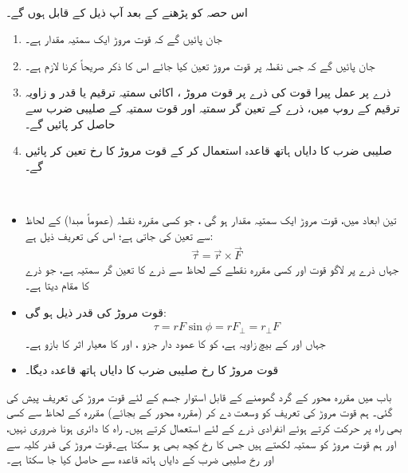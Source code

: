\\
اس حصہ کو پڑھنے کے بعد آپ ذیل کے قابل ہوں گے۔
\begin{enumerate}[1.]
\item
جان پائیں گے کہ قوت مروڑ ایک  سمتیہ  مقدار ہے۔
\item
جان پائیں گے کہ جس نقطہ پر قوت مروڑ  تعین کیا جائے اس  کا   ذکر صریحاً  کرنا   لازم ہے۔
\item
ذرے پر عمل پیرا قوت کی ذرے پر قوت مروڑ ، اکائی سمتیہ ترقیم یا قدر و زاویہ ترقیم  کے روپ میں،  ذرے کے تعین گر سمتیہ  اور قوت سمتیہ  کے صلیبی ضرب سے حاصل  کر پائیں گے۔
\item
صلیبی ضرب   کا دایاں ہاتھ قاعدہ استعمال کر کے قوت مروڑ کا رخ تعین کر پائیں گے۔
\end{enumerate}

\\
\begin{itemize}
\item
تین ابعاد میں، قوت مروڑ ایک  سمتیہ مقدار  ہو گی  ، جو کسی مقررہ نقطہ (عموماً مبدا)  کے لحاظ سے تعین کی جاتی ہے؛ اس کی تعریف ذیل ہے:
\begin{align*}
\vec{\tau}=\vec{r}\times \vec{F}
\end{align*}
جہاں  ذرے پر لاگو قوت اور    کسی مقررہ نقطے کے لحاظ سے ذرے کا تعین گر سمتیہ ہے، جو ذرے کا مقام دیتا ہے۔
\item
قوت مروڑ  کی قدر   ذیل ہو گی:
\begin{align*}
\tau=rF\sin\phi=rF_{\perp}=r_{\perp}F
\end{align*}
جہاں  اور  کے بیچ زاویہ  ہے،  کو  کا عمود دار جزو ، اور   کا معیار اثر کا بازو  ہے۔
\item
قوت مروڑ  کا رخ صلیبی ضرب کا دایاں ہاتھ قاعدہ  دیگا۔
\end{itemize}

باب  میں مقررہ محور کے گرد گھومنے کے قابل  استوار جسم   کے لئے قوت مروڑ  کی تعریف پیش کی گئی۔ ہم قوت مروڑ کی تعریف کو وسعت دے کر  (مقررہ محور کے بجائے)  مقررہ   کے لحاظ سے کسی بھی راہ پر حرکت کرتے ہوئے  انفرادی ذرے   کے لئے استعمال کرتے ہیں۔ راہ کا دائری ہونا ضروری نہیں، اور ہم قوت مروڑ کو سمتیہ  لکھتے ہیں جس کا رخ کچھ بھی ہو سکتا ہے۔قوت مروڑ کی قدر کلیہ سے اور رخ صلیبی ضرب کے دایاں ہاتھ قاعدہ سے حاصل  کیا جا سکتا ہے۔

